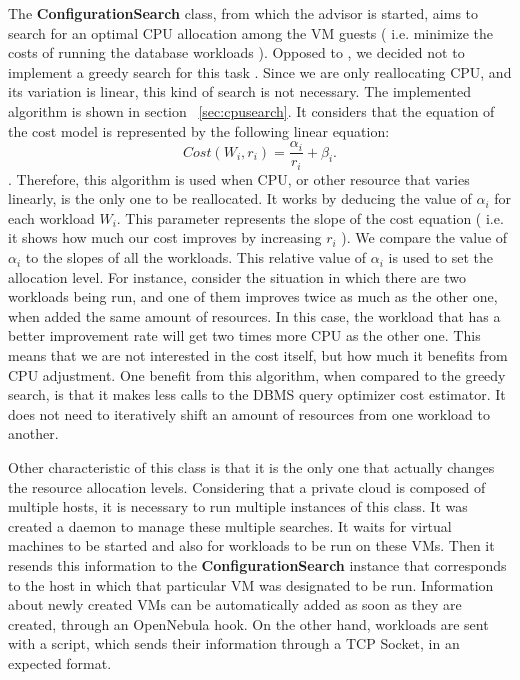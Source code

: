 \documentclass[jidm,a4paper]{jidm} %
\begin{document}
The \textbf{ConfigurationSearch} class, from which the advisor is started,  aims to search for an optimal CPU allocation among the VM guests ( i.e. minimize the costs of running the database workloads ). Opposed to \cite{Soror:2008:AVM:1376616.1376711}, we decided not to implement a greedy search for this task . Since we are only reallocating CPU, and its variation is linear, this kind of search is not necessary. The implemented algorithm is shown in section ~\ref{sec:cpusearch}. It considers that the equation of the cost model is represented by the following linear equation:
\[
 Cost(W_{i}, r_{i}) = \frac{\alpha_{i}}{r_{i}} +\beta_{i}.
\].
Therefore, this algorithm is used when CPU, or other resource that varies linearly, is the only one to be reallocated. It works by deducing the value of $\alpha_{i}$ for each workload $W_{i}$. This parameter represents the slope of the cost equation ( i.e. it shows how much our cost improves by increasing $r_{i}$ ). We compare the  value of $\alpha_{i}$ to the slopes of all the workloads. This relative value of $\alpha_{i}$ is used to set the allocation level. For instance, consider the situation in which there are two workloads being run, and one of them improves twice as much as the other one, when added the same amount of resources. In this case, the workload that has a better improvement rate will get two times more CPU as the other one. This means that we are not interested in the cost itself, but how much it benefits from CPU adjustment. One benefit from this algorithm, when compared to the greedy search, is that it makes less calls to the DBMS query optimizer cost estimator. It does not need to iteratively shift an amount of resources from one workload to another.


Other characteristic of this class is that it is the only one that actually changes the resource allocation levels. Considering that a private cloud is composed of multiple hosts, it is necessary to run multiple instances of this class. It was created a daemon to manage these multiple searches. It waits for virtual machines to be started and also for workloads to be run on these VMs. Then it resends this information to the \textbf{ConfigurationSearch} instance that corresponds to the host in which that particular VM was designated to be run. Information about newly created VMs can be automatically added as soon as they are created, through an OpenNebula hook. On the other hand, workloads are sent with a script, which sends their information through a TCP Socket, in an expected format.
\end{document}
